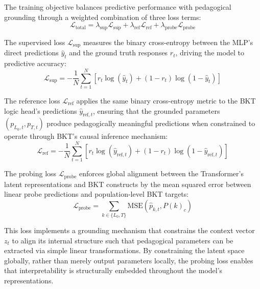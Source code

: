 \documentclass[applsci,article,submit,moreauthors,pdftex]{Definitions/mdpi}
\begin{document}
The training objective balances predictive performance with pedagogical grounding through a weighted combination of three loss terms:
\begin{equation} \label{eq:total_loss}
    \mathcal{L}_{\text{total}} = \lambda_{\text{sup}} \mathcal{L}_{\text{sup}} + \lambda_{\text{ref}} \mathcal{L}_{\text{ref}} + \lambda_{\text{probe}} \mathcal{L}_{\text{probe}}
\end{equation}

The supervised loss $\mathcal{L}_{\text{sup}}$ measures the binary cross-entropy between the MLP's direct predictions $\hat{y}_t$ and the ground truth responses $r_t$, driving the model to  predictive accuracy:
\begin{equation}
    \mathcal{L}_{\text{sup}} = -\frac{1}{N} \sum_{t=1}^N \left[ r_t \log(\hat{y}_t) + (1-r_t) \log(1-\hat{y}_t) \right]
\end{equation}

The reference loss $\mathcal{L}_{\text{ref}}$ applies the same binary cross-entropy metric to the BKT logic head's predictions $\hat{y}_{\text{ref},t}$, ensuring that the grounded parameters $(p_{L_0,t}, p_{T,t})$ produce pedagogically meaningful predictions when constrained to operate through BKT's causal inference mechanism:
\begin{equation}
    \mathcal{L}_{\text{ref}} = -\frac{1}{N} \sum_{t=1}^N \left[ r_t \log(\hat{y}_{\text{ref},t}) + (1-r_t) \log(1-\hat{y}_{\text{ref},t}) \right]
\end{equation}

The probing loss $\mathcal{L}_{\text{probe}}$ enforces global alignment between the Transformer's latent representations and BKT constructs by  the mean squared error between linear probe predictions and population-level BKT targets:
\begin{equation}
    \mathcal{L}_{\text{probe}} = \sum_{k \in \{L_0, T\}} \text{MSE}\left( \hat{p}_{k,t}, P(k)_c \right)
\end{equation}

This loss implements a grounding mechanism that constrains the context vector $z_t$ to align its internal structure such that pedagogical parameters can be extracted via simple linear transformations. By constraining the latent space globally, rather than merely  output parameters locally, the probing loss enables that interpretability is structurally embedded throughout the model's representations.
\end{document}
